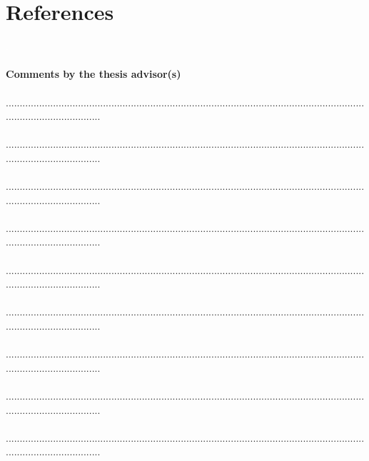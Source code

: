 \documentclass[11pt,titlepage]{article}
\begin{document}
\nocite{Wicaksono2014a}
\nocite{Wicaksono2014b}
\nocite{Wicaksono2014c}
\nocite{Wicaksono2015a}
\nocite{Wicaksono2015b}
\nocite{Wicaksono2015c}

\section{References}

\printbibliography[heading=none]

\newpage
\textcolor{white}.\\\\
\noindent \textbf{Comments by the thesis advisor(s)}\\\\
...................................................................................................................................................................\\\\
...................................................................................................................................................................\\\\
...................................................................................................................................................................\\\\
...................................................................................................................................................................\\\\
...................................................................................................................................................................\\\\
...................................................................................................................................................................\\\\
...................................................................................................................................................................\\\\
...................................................................................................................................................................\\\\
...................................................................................................................................................................\\\\
\end{document}
